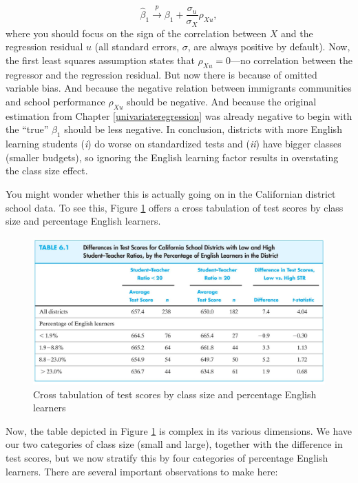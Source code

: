\documentclass[
]{book}
\begin{document}
\begin{equation}
\hat{\beta}_1 \overset{p}{\to} \beta_1 + \frac{\sigma_u}{\sigma_X}\rho_{Xu},
\end{equation}
where you should focus on the sign of the correlation between \(X\) and the regression residual \(u\) (all standard errors, \(\sigma\), are always positive by default). Now, the first least squares assumption states that \(\rho_{Xu} = 0\)---no correlation between the regressor and the regression residual. But now there is because of omitted variable bias. And because the negative relation between immigrants communities and school performance \(\rho_{Xu}\) should be negative. And because the original estimation from Chapter \ref{univariateregression} was already negative to begin with the ``true'' \(\beta_1\) should be less negative. In conclusion, districts with more English learning students (\emph{i}) do worse on standardized tests and (\emph{ii}) have bigger classes (smaller budgets), so ignoring the English learning factor results in overstating the class size effect.

You might wonder whether this is actually going on in the Californian district school data. To see this, Figure \ref{fig:omitca} offers a cross tabulation of test scores by class size and percentage English learners.

\begin{figure}

{\centering \includegraphics[width=800px]{./figures/Sheet7} 

}

\caption{Cross tabulation of test scores by class size and percentage English learners}\label{fig:omitca}
\end{figure}

Now, the table depicted in Figure \ref{fig:omitca} is complex in its various dimensions. We have our two categories of class size (small and large), together with the difference in test scores, but we now stratify this by four categories of percentage English learners. There are several important observations to make here:
\end{document}
